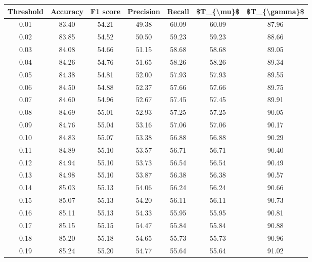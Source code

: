 \begin{tabular}{|c|c|c|c|c|c|c|}
\hline
 Threshold &  Accuracy &  F1 score &  Precision &  Recall &  \$T\_\{\textbackslash mu\}\$ &  \$T\_\{\textbackslash gamma\}\$ \\
\hline
      0.01 &     83.40 &     54.21 &      49.38 &   60.09 &      60.09 &         87.96 \\
      0.02 &     83.85 &     54.52 &      50.50 &   59.23 &      59.23 &         88.66 \\
      0.03 &     84.08 &     54.66 &      51.15 &   58.68 &      58.68 &         89.05 \\
      0.04 &     84.26 &     54.76 &      51.65 &   58.26 &      58.26 &         89.34 \\
      0.05 &     84.38 &     54.81 &      52.00 &   57.93 &      57.93 &         89.55 \\
      0.06 &     84.50 &     54.88 &      52.37 &   57.66 &      57.66 &         89.75 \\
      0.07 &     84.60 &     54.96 &      52.67 &   57.45 &      57.45 &         89.91 \\
      0.08 &     84.69 &     55.01 &      52.93 &   57.25 &      57.25 &         90.05 \\
      0.09 &     84.76 &     55.04 &      53.16 &   57.06 &      57.06 &         90.17 \\
      0.10 &     84.83 &     55.07 &      53.38 &   56.88 &      56.88 &         90.29 \\
      0.11 &     84.89 &     55.10 &      53.57 &   56.71 &      56.71 &         90.40 \\
      0.12 &     84.94 &     55.10 &      53.73 &   56.54 &      56.54 &         90.49 \\
      0.13 &     84.98 &     55.10 &      53.87 &   56.38 &      56.38 &         90.57 \\
      0.14 &     85.03 &     55.13 &      54.06 &   56.24 &      56.24 &         90.66 \\
      0.15 &     85.07 &     55.13 &      54.20 &   56.11 &      56.11 &         90.73 \\
      0.16 &     85.11 &     55.13 &      54.33 &   55.95 &      55.95 &         90.81 \\
      0.17 &     85.15 &     55.15 &      54.47 &   55.84 &      55.84 &         90.88 \\
      0.18 &     85.20 &     55.18 &      54.65 &   55.73 &      55.73 &         90.96 \\
      0.19 &     85.24 &     55.20 &      54.77 &   55.64 &      55.64 &         91.02 \\

\end{tabular}
